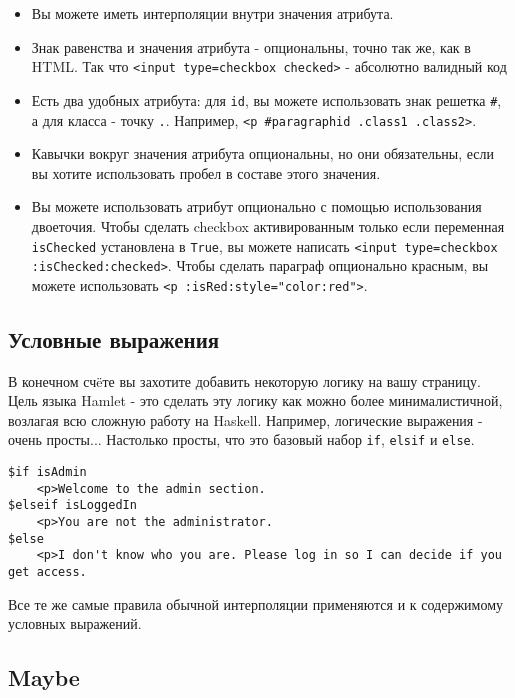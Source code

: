 \begin{itemize}
\item Вы можете иметь интерполяции внутри значения атрибута. 
\item Знак равенства и значения атрибута - опциональны, точно так же, как в HTML.
Так что \lstinline!<input type=checkbox checked>! - абсолютно валидный код
\item Есть два удобных атрибута: для \lstinline!id!, вы можете использовать знак 
решетка \texttt{#}, а для класса - точку \texttt{.}. Например, \lstinline!<p #paragraphid .class1 .class2>!.
\item Кавычки вокруг значения атрибута опциональны, но они обязательны, если вы
хотите использовать пробел в составе этого значения.
\item Вы можете использовать атрибут опционально с помощью использования двоеточия.
Чтобы сделать checkbox активированным только если переменная \lstinline!isChecked!
установлена в \lstinline!True!, вы можете написать
\lstinline!<input type=checkbox :isChecked:checked>!.
Чтобы сделать параграф опционально красным, вы можете использовать
\lstinline!<p :isRed:style="color:red">!.
\end{itemize}


\subsection{Условные выражения}

В конечном счëте вы захотите добавить некоторую логику на вашу страницу. Цель
языка Hamlet - это сделать эту логику как можно более минималистичной, возлагая
всю сложную работу на Haskell. Например, логические выражения - очень просты...
Настолько просты, что это базовый набор \texttt{if}, \texttt{elsif} и 
\texttt{else}.

\begin{lstlisting}
$if isAdmin
    <p>Welcome to the admin section.
$elseif isLoggedIn
    <p>You are not the administrator.
$else
    <p>I don't know who you are. Please log in so I can decide if you get access.
\end{lstlisting}

Все те же самые правила обычной интерполяции применяются и к содержимому 
условных выражений.

\subsection{Maybe}

